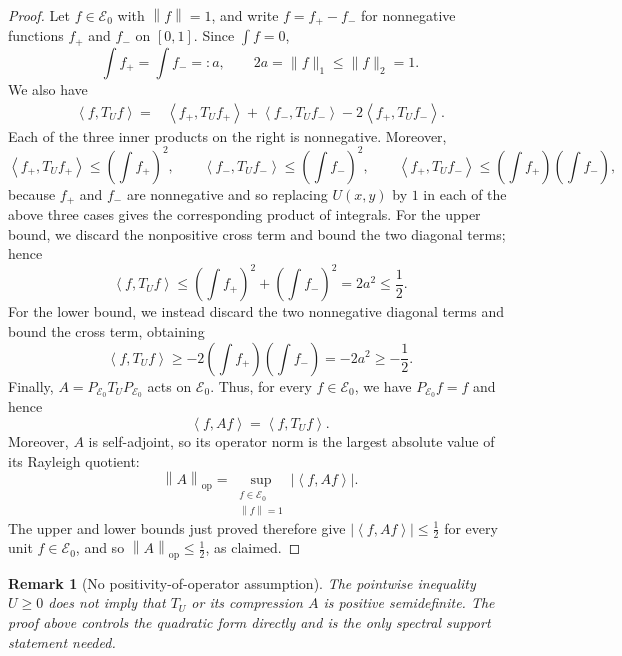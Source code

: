 \documentclass[11pt]{article}
\newtheorem{remark}[theorem]{Remark}
\newcommand{\ip}[2]{\left\langle #1,#2\right\rangle}
\newcommand{\norm}[1]{\left\lVert #1\right\rVert}
\begin{document}
\begin{proof}
Let \(f\in\mathcal E_0\) with \(\norm f=1\), and write \(f=f_+-f_-\) for nonnegative
functions \(f_+\) and \(f_-\) on \([0,1]\).  Since
\(\int f=0\),
\[
       \int f_+=\int f_-=:a,
       \qquad 2a=\lVert f\rVert_1\le\lVert f\rVert_2=1.
\]
We also have
\[
\begin{aligned}
 \ip f{T_Uf}
 ={}&\ip {f_+}{T_Uf_+}+\ip {f_-}{T_Uf_-}
      -2\ip {f_+}{T_Uf_-}.
\end{aligned}
\]
Each of the three inner products on the right is nonnegative.  Moreover,
\[
 \ip {f_+}{T_Uf_+}\le\left(\int f_+\right)^2,
 \qquad
 \ip {f_-}{T_Uf_-}\le\left(\int f_-\right)^2,
 \qquad
 \ip {f_+}{T_Uf_-}
 \le\left(\int f_+\right)\left(\int f_-\right),
\]
because \(f_+\) and \(f_-\) are nonnegative and so replacing \(U(x,y)\) by \(1\) in each of the above three cases gives the corresponding product of
integrals.  For the upper bound, we discard the nonpositive cross term and
bound the two diagonal terms; hence
\[
 \ip f{T_Uf}
 \le\left(\int f_+\right)^2+\left(\int f_-\right)^2
 =2a^2\le\frac12.
\]
For the lower bound, we instead discard the two nonnegative diagonal terms
and bound the cross term, obtaining
\[
 \ip f{T_Uf}
 \ge-2\left(\int f_+\right)\left(\int f_-\right)
 =-2a^2\ge-\frac12.
\]
Finally, \(A=P_{\mathcal E_0}T_UP_{\mathcal E_0}\) acts on \(\mathcal E_0\).
Thus, for every \(f\in\mathcal E_0\), we have \(P_{\mathcal E_0}f=f\) and hence
\[
       \ip f{Af}=\ip f{T_Uf}.
\]
Moreover, \(A\) is self-adjoint, so its operator norm is the largest absolute
value of its Rayleigh quotient:
\[
 \norm A_{\mathrm{op}}
 =\sup_{\substack{f\in\mathcal E_0\\ \norm f=1}}
    \bigl|\ip f{Af}\bigr|.
\]
The upper and lower bounds just proved therefore give
\(\bigl|\ip f{Af}\bigr|\le\tfrac12\) for every unit \(f\in\mathcal E_0\), and
so \(\norm A_{\mathrm{op}}\le\tfrac12\), as claimed.
\end{proof}

\begin{remark}[No positivity-of-operator assumption]
The pointwise inequality \(U\ge0\) does \emph{not} imply that \(T_U\) or its
compression \(A\) is positive semidefinite.  The proof above controls the
quadratic form directly and is the only spectral support statement needed.
\end{remark}
\end{document}
